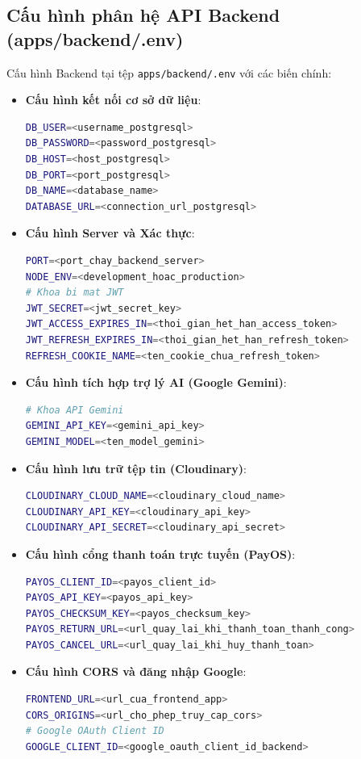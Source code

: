 \documentclass[../DoAn.tex]{subfiles}
\begin{document}
\subsection{Cấu hình phân hệ API Backend (apps/backend/.env)}
Cấu hình Backend tại tệp \texttt{apps/backend/.env} với các biến chính:
\begin{itemize}
    \item \textbf{Cấu hình kết nối cơ sở dữ liệu}:
    \begin{lstlisting}[language=bash]
DB_USER=<username_postgresql>
DB_PASSWORD=<password_postgresql>
DB_HOST=<host_postgresql>
DB_PORT=<port_postgresql>
DB_NAME=<database_name>
DATABASE_URL=<connection_url_postgresql>
    \end{lstlisting}

    \item \textbf{Cấu hình Server và Xác thực}:
    \begin{lstlisting}[language=bash]
PORT=<port_chay_backend_server>
NODE_ENV=<development_hoac_production>
# Khoa bi mat JWT
JWT_SECRET=<jwt_secret_key>
JWT_ACCESS_EXPIRES_IN=<thoi_gian_het_han_access_token>
JWT_REFRESH_EXPIRES_IN=<thoi_gian_het_han_refresh_token>
REFRESH_COOKIE_NAME=<ten_cookie_chua_refresh_token>
    \end{lstlisting}

    \item \textbf{Cấu hình tích hợp trợ lý AI (Google Gemini)}:
    \begin{lstlisting}[language=bash]
# Khoa API Gemini
GEMINI_API_KEY=<gemini_api_key>
GEMINI_MODEL=<ten_model_gemini>
    \end{lstlisting}

    \item \textbf{Cấu hình lưu trữ tệp tin (Cloudinary)}:
    \begin{lstlisting}[language=bash]
CLOUDINARY_CLOUD_NAME=<cloudinary_cloud_name>
CLOUDINARY_API_KEY=<cloudinary_api_key>
CLOUDINARY_API_SECRET=<cloudinary_api_secret>
    \end{lstlisting}

    \item \textbf{Cấu hình cổng thanh toán trực tuyến (PayOS)}:
    \begin{lstlisting}[language=bash]
PAYOS_CLIENT_ID=<payos_client_id>
PAYOS_API_KEY=<payos_api_key>
PAYOS_CHECKSUM_KEY=<payos_checksum_key>
PAYOS_RETURN_URL=<url_quay_lai_khi_thanh_toan_thanh_cong>
PAYOS_CANCEL_URL=<url_quay_lai_khi_huy_thanh_toan>
    \end{lstlisting}

    \item \textbf{Cấu hình CORS và đăng nhập Google}:
    \begin{lstlisting}[language=bash]
FRONTEND_URL=<url_cua_frontend_app>
CORS_ORIGINS=<url_cho_phep_truy_cap_cors>
# Google OAuth Client ID
GOOGLE_CLIENT_ID=<google_oauth_client_id_backend>
    \end{lstlisting}
\end{itemize}
\end{document}
